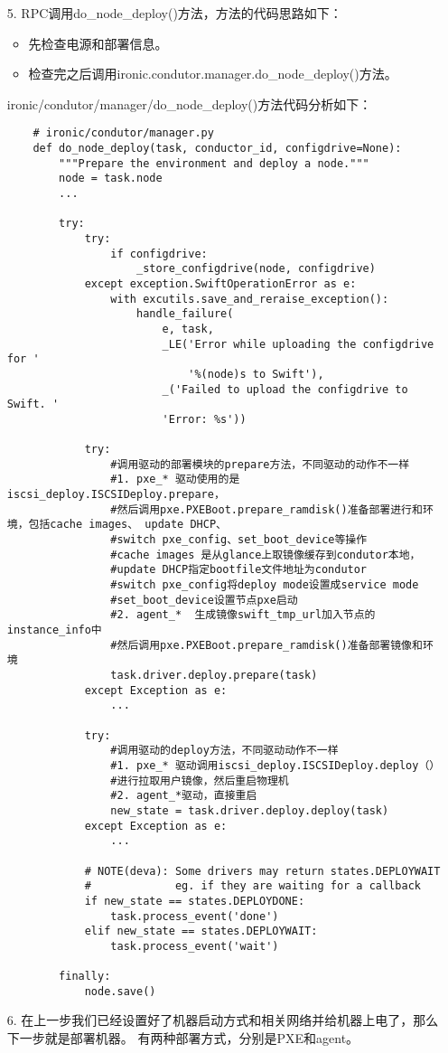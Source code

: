 \documentclass[a4paper,left=1.5cm,right=1.5cm,11pt]{article}
\begin{document}
\begin{itemize}
		\item[5.] RPC调用do\_node\_deploy()方法，方法的代码思路如下：
		\begin{itemize}
			\item 先检查电源和部署信息。
			\item 检查完之后调用ironic.condutor.manager.do\_node\_deploy()方法。
		\end{itemize}

		ironic/condutor/manager/do\_node\_deploy()方法代码分析如下：
		\begin{lstlisting}
	# ironic/condutor/manager.py
	def do_node_deploy(task, conductor_id, configdrive=None):
		"""Prepare the environment and deploy a node."""
		node = task.node
		...

		try:
			try:
				if configdrive:
					_store_configdrive(node, configdrive)
			except exception.SwiftOperationError as e:
				with excutils.save_and_reraise_exception():
					handle_failure(
						e, task,
						_LE('Error while uploading the configdrive for '
							'%(node)s to Swift'),
						_('Failed to upload the configdrive to Swift. '
						'Error: %s'))

			try:
				#调用驱动的部署模块的prepare方法，不同驱动的动作不一样
				#1. pxe_* 驱动使用的是iscsi_deploy.ISCSIDeploy.prepare，
				#然后调用pxe.PXEBoot.prepare_ramdisk()准备部署进行和环境，包括cache images、 update DHCP、
				#switch pxe_config、set_boot_device等操作
				#cache images 是从glance上取镜像缓存到condutor本地，
				#update DHCP指定bootfile文件地址为condutor
				#switch pxe_config将deploy mode设置成service mode
				#set_boot_device设置节点pxe启动
				#2. agent_*  生成镜像swift_tmp_url加入节点的instance_info中
				#然后调用pxe.PXEBoot.prepare_ramdisk()准备部署镜像和环境
				task.driver.deploy.prepare(task)
			except Exception as e:
				...

			try:
				#调用驱动的deploy方法，不同驱动动作不一样
				#1. pxe_* 驱动调用iscsi_deploy.ISCSIDeploy.deploy（）
				#进行拉取用户镜像，然后重启物理机
				#2. agent_*驱动，直接重启
				new_state = task.driver.deploy.deploy(task)
			except Exception as e:
				...

			# NOTE(deva): Some drivers may return states.DEPLOYWAIT
			#             eg. if they are waiting for a callback
			if new_state == states.DEPLOYDONE:
				task.process_event('done')
			elif new_state == states.DEPLOYWAIT:
				task.process_event('wait')

		finally:
			node.save()
		\end{lstlisting}

		\item[6.] 在上一步我们已经设置好了机器启动方式和相关网络并给机器上电了，那么下一步就是部署机器。
		有两种部署方式，分别是PXE和agent。
	\end{itemize}
\end{document}
